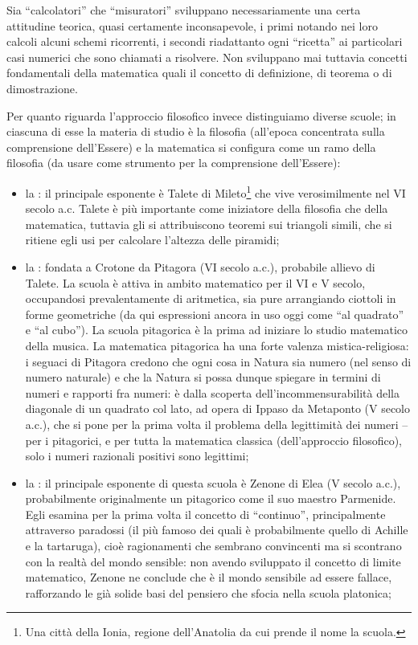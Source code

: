 \par Sia ``calcolatori'' che ``misuratori'' sviluppano necessariamente una certa attitudine teorica, quasi certamente inconsapevole, i primi notando nei loro calcoli alcuni schemi ricorrenti, i secondi riadattanto ogni ``ricetta'' ai particolari casi numerici che sono chiamati a risolvere. Non sviluppano mai tuttavia concetti fondamentali della matematica quali il concetto di definizione, di teorema o di dimostrazione.
\par Per quanto riguarda l'approccio filosofico invece distinguiamo diverse scuole; in ciascuna di esse la materia di studio \`e la filosofia (all'epoca concentrata sulla comprensione dell'Essere) e la matematica si configura come un ramo della filosofia (da usare come strumento per la comprensione dell'Essere):
\begin{itemize}
	\item la : il principale esponente \`e Talete di Mileto\footnote{Una citt\`a della Ionia, regione dell'Anatolia da cui prende il nome la scuola.} che vive verosimilmente nel VI secolo a.c. Talete \`e pi\`u importante come iniziatore della filosofia che della matematica, tuttavia gli si attribuiscono teoremi sui triangoli simili, che si ritiene egli usi per calcolare l'altezza delle piramidi;
	\item la : fondata a Crotone da Pitagora (VI secolo a.c.), probabile allievo di Talete. La scuola \`e attiva in ambito matematico per il VI e V secolo, occupandosi prevalentamente di aritmetica, sia pure arrangiando ciottoli in forme geometriche (da qui espressioni ancora in uso oggi come ``al quadrato'' e ``al cubo''). La scuola pitagorica \`e la prima ad iniziare lo studio matematico della musica. La matematica pitagorica ha una forte valenza mistica-religiosa: i seguaci di Pitagora credono che ogni cosa in Natura sia numero (nel senso di numero naturale) e che la Natura si possa dunque spiegare in termini di numeri e rapporti fra numeri: \`e dalla scoperta dell'incommensurabilit\`a della diagonale di un quadrato col lato, ad opera di Ippaso da Metaponto (V secolo a.c.), che si pone per la prima volta il problema della legittimit\`a dei numeri -- per i pitagorici, e per tutta la matematica classica (dell'approccio filosofico), solo i numeri razionali positivi sono legittimi;
	\item la : il principale esponente di questa scuola \`e Zenone di Elea (V secolo a.c.), probabilmente originalmente un pitagorico come il suo maestro Parmenide. Egli esamina per la prima volta il concetto di ``continuo'', principalmente attraverso paradossi (il pi\`u famoso dei quali \`e probabilmente quello di Achille e la tartaruga), cio\`e ragionamenti che sembrano convincenti ma si scontrano con la realt\`a del mondo sensible: non avendo sviluppato il concetto di limite matematico, Zenone ne conclude che \`e il mondo sensibile ad essere fallace, rafforzando le gi\`a solide basi del pensiero che sfocia nella scuola platonica;

\end{itemize}
